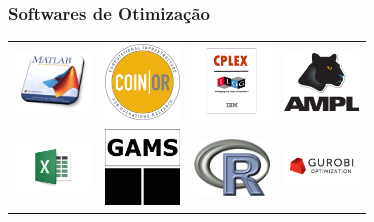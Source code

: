 \documentclass{beamer}
\begin{document}
\begin{frame}
	\frametitle{Softwares de Otimização }
	\centering
	\begin{table}
		\begin{tabular}{c c c c}
		\includegraphics[width=2cm,height=2cm]{solver_matlab.png} & 
		\includegraphics[width=2cm,height=2cm]{solver_coin.png} &
		\includegraphics[width=2cm,height=2cm]{solver_cplex.jpg} &
		\includegraphics[width=2cm,height=2cm]{solver_ampl.jpg} \\
		\includegraphics[width=2cm,height=2cm]{solver_excel.png} & 
		\includegraphics[width=2cm,height=2cm]{solver_gams.png} &
		\includegraphics[width=2cm,height=2cm]{solver_R.png} &		
		\includegraphics[width=2cm,height=2cm]{solver_gurobi.png} \\

\end{tabular}
\end{table}
\end{frame}
\end{document}
